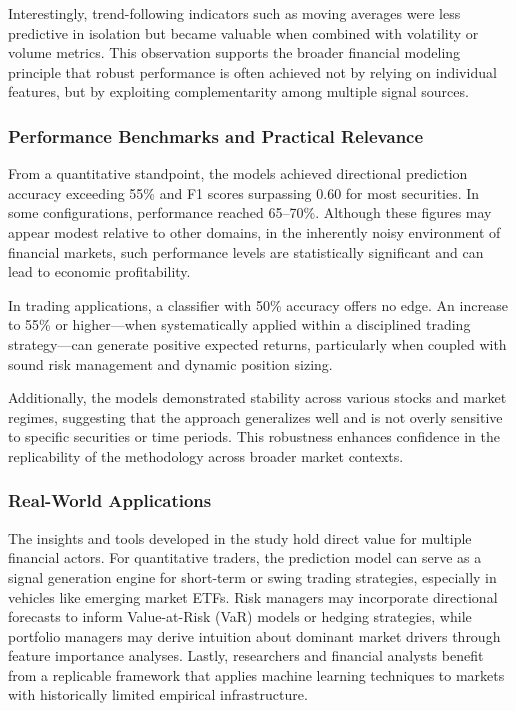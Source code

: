 Interestingly, trend-following indicators such as moving averages were less predictive in isolation but became valuable when combined with volatility or volume metrics. This observation supports the broader financial modeling principle that robust performance is often achieved not by relying on individual features, but by exploiting complementarity among multiple signal sources.

\subsubsection{Performance Benchmarks and Practical Relevance}

From a quantitative standpoint, the models achieved directional prediction accuracy exceeding 55\% and F1 scores surpassing 0.60 for most securities. In some configurations, performance reached 65–70\%. Although these figures may appear modest relative to other domains, in the inherently noisy environment of financial markets, such performance levels are statistically significant and can lead to economic profitability.

In trading applications, a classifier with 50\% accuracy offers no edge. An increase to 55\% or higher—when systematically applied within a disciplined trading strategy—can generate positive expected returns, particularly when coupled with sound risk management and dynamic position sizing.

Additionally, the models demonstrated stability across various stocks and market regimes, suggesting that the approach generalizes well and is not overly sensitive to specific securities or time periods. This robustness enhances confidence in the replicability of the methodology across broader market contexts.

\subsubsection{Real-World Applications}

The insights and tools developed in the study hold direct value for multiple financial actors. For quantitative traders, the prediction model can serve as a signal generation engine for short-term or swing trading strategies, especially in vehicles like emerging market ETFs. Risk managers may incorporate directional forecasts to inform Value-at-Risk (VaR) models or hedging strategies, while portfolio managers may derive intuition about dominant market drivers through feature importance analyses. Lastly, researchers and financial analysts benefit from a replicable framework that applies machine learning techniques to markets with historically limited empirical infrastructure.


